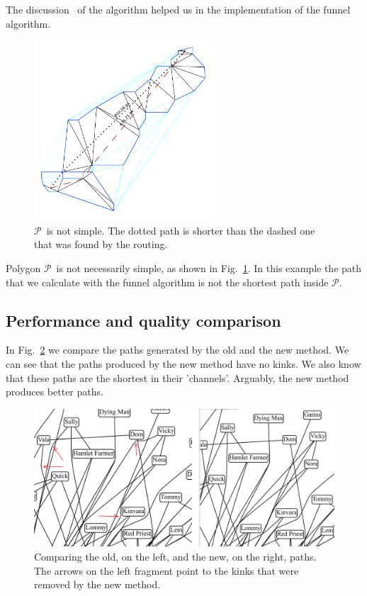 \documentclass{gd-llncs}
\newcommand{\plg}{$\mathcal{P}$}
\begin{document}
{The discussion~\cite{pathOpt} of the algorithm helped us in the implementation of the funnel algorithm.\\
\begin{figure}[]
  \centering
  \includegraphics*[width=0.6\textwidth]{sleeve_diagonals_not_optimal.pdf}
  \caption{\plg~is not simple. The dotted path is shorter than the dashed one that was found by the routing.}
  \label{fig:non_optimal_path}
\end{figure}
Polygon \plg~is not necessarily simple, as shown in Fig.~\ref{fig:non_optimal_path}.
In this example the path that we calculate with the funnel algorithm is not the shortest path inside \plg.
\subsection*{Performance and quality comparison}
In Fig.~\ref{fig:improved_routing} we compare the paths generated by the old and the new method. We can see that the paths produced by the new method have no kinks. We also know that these paths are  the shortest in their 'channels'. Arguably, the new method produces better paths.
\begin{figure}[]
  \centering
  \includegraphics*[width=1\textwidth]{comparison.png}
  \caption{Comparing the old, on the left, and the new, on the right, paths. The arrows on the left fragment point to the kinks that were removed by the new method.}
  \label{fig:improved_routing}
\end{figure}


}
\end{document}
